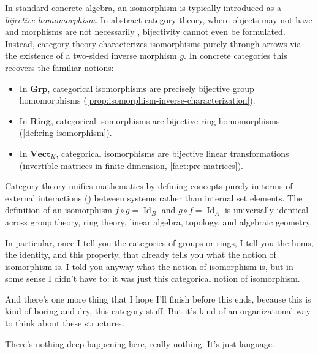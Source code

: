 \begin{content}
\begin{steps}
In standard concrete algebra, an isomorphism is typically introduced as a \emph{bijective homomorphism}. In abstract category theory, where objects may not have  and morphisms are not necessarily , bijectivity cannot even be formulated. Instead, category theory characterizes isomorphisms purely through arrows via the existence of a two-sided inverse morphism $g$. In concrete categories this recovers the familiar notions:
\begin{itemize}
    \item In $\mathbf{Grp}$, categorical isomorphisms are precisely bijective group homomorphisms (\cref{prop:isomorphism-inverse-characterization}).
    \item In $\mathbf{Ring}$, categorical isomorphisms are bijective ring homomorphisms (\cref{def:ring-isomorphism}).
    \item In $\mathbf{Vect}_K$, categorical isomorphisms are bijective linear transformations (invertible matrices in finite dimension, \cref{fact:pre-matrices}).
\end{itemize}
\end{steps}
\end{content}

\begin{insight}
Category theory unifies mathematics by defining concepts purely in terms of external interactions () between systems rather than internal set elements. The definition of an isomorphism $f \circ g = \operatorname{Id}_B$ and $g \circ f = \operatorname{Id}_A$ is universally identical across group theory, ring theory, linear algebra, topology, and algebraic geometry.
\end{insight}

\begin{speech}[01:21:46 - 01:22:27]
In particular, once I tell you the categories of groups or rings, I tell you the homs, the identity, and this property, that already tells you what the notion of isomorphism is. I told you anyway what the notion of isomorphism is, but in some sense I didn't have to: it was just this categorical notion of isomorphism.

And there's one more thing that I hope I'll finish before this ends, because this is kind of boring and dry, this category stuff. But it's kind of an organizational way to think about these structures.

There's nothing deep happening here, really nothing. It's just language.
\end{speech}

